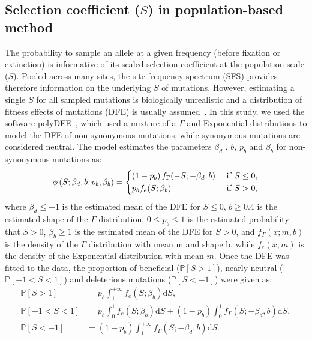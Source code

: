 \documentclass{article}
\newcommand{\der}{\textrm{d}}
\newcommand{\proba}{\mathbb{P}}
\newcommand{\Spop}{S}
\newcommand{\polyDel}{\Spop < -1}
\newcommand{\polyNeutral}{-1 < \Spop < 1}
\newcommand{\polyAdv}{ \Spop > 1}
\newcommand{\PpolyDel}{\proba \left[ \polyDel \right]}
\newcommand{\PpolyNeutral}{\proba \left[ \polyNeutral \right]}
\newcommand{\PpolyAdv}{\proba \left[ \polyAdv \right]}
\newcommand{\AdvMean}{\beta_b}
\newcommand{\DelMean}{\beta_d}
\begin{document}
    \subsection{Selection coefficient ($\Spop$) in population-based method}
    \label{subsec:s-polymorphism-method}
    The probability to sample an allele at a given frequency (before fixation or extinction) is informative of its scaled selection coefficient at the population scale ($\Spop$).
    Pooled across many sites, the site-frequency spectrum (SFS) provides therefore information on the underlying $\Spop$ of mutations.
    However, estimating a single $\Spop$ for all sampled mutations is biologically unrealistic and a distribution of fitness effects of mutations (DFE) is usually assumed~\cite{eyre-walker_distribution_2006a, eyre-walker_estimating_2009a}.
    In this study, we used the software polyDFE~\cite{tataru_inference_2017, tataru_polydfe_2020}, which used a mixture of a $\Gamma$ and Exponential distributions to model the DFE of non-synonymous mutations, while synonymous mutations are considered neutral.
    The model estimates the parameters $\DelMean$ , $b$, $p_b$ and $\AdvMean$ for non-synonymous mutations as:
    \begin{equation}
        \phi \left( \Spop; \DelMean , b, p_b, \AdvMean \right) =
        \begin{dcases}
            \left( 1 - p_b \right) f_{\Gamma}(-\Spop; -\DelMean, b) & \text{ if $\Spop \leq 0$,} \\
            p_b f_{e}(\Spop; \AdvMean) & \text{ if $\Spop > 0$,} \\
        \end{dcases}
    \end{equation}
    where $\DelMean \leq -1 $ is the estimated mean of the DFE for $\Spop \leq 0$,
    $b \geq 0.4$ is the estimated shape of the $\Gamma$ distribution,
    $0 \leq p_b \leq 1$ is the estimated probability that $\Spop > 0$,
    $\AdvMean \geq 1$ is the estimated mean of the DFE for $\Spop > 0$,
    and $f_{\Gamma}(x; m, b)$ is the density of the $\Gamma$ distribution with mean m and shape b, while $f_{e}(x; m)$ is the density of the Exponential distribution with mean $m$.
    Once the DFE was fitted to the data, the proportion of beneficial ($\PpolyAdv$), nearly-neutral ($\PpolyNeutral$) and deleterious mutations ($\PpolyDel$) were given as:
    \begin{align}
        \PpolyAdv &= p_b \int_{1}^{+\infty} f_{e}(\Spop; \AdvMean) \der \Spop,  \label{eq:polyProbaAdv} \\
        \PpolyNeutral &= p_b \int_{0}^{1} f_{e}(\Spop; \AdvMean) \der \Spop + \left( 1 - p_b \right) \int_{0}^{1} f_{\Gamma}(\Spop; -\DelMean, b) \der \Spop, \\
        \PpolyDel &= \left( 1 - p_b \right) \int_{1}^{+\infty} f_{\Gamma}(\Spop; -\DelMean, b) \der \Spop. \label{eq:polyProbaDel}
    \end{align}
\end{document}
